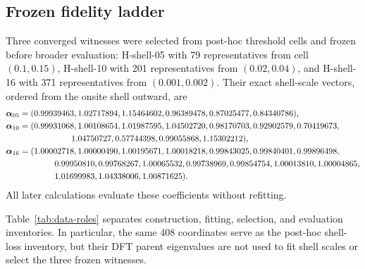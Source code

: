 \documentclass[11pt]{article}
\theoremstyle{definition}
\begin{document}
\subsection{Frozen fidelity ladder}

Three converged witnesses were selected from post-hoc threshold cells and frozen before
broader evaluation: H-shell-05 with 79 representatives from cell $(0.1,0.15)$,
H-shell-10 with 201 representatives from $(0.02,0.04)$, and H-shell-16 with 371
representatives from $(0.001,0.002)$.  Their exact shell-scale vectors, ordered from the
onsite shell outward, are
\begin{align}
 \boldsymbol\alpha_{05}={}&(0.99939463,1.02717894,1.15464602,
 0.96389478,0.87025477,0.84340786),\\
 \boldsymbol\alpha_{10}={}&(0.99931068,1.00108654,1.01987595,
 1.04502720,0.98170703,0.92902579,0.70419673,\nonumber\\
 &\hspace{17mm}1.04750727,0.57744398,0.99055868,1.15302212),\\
 \boldsymbol\alpha_{16}={}&(1.00002718,1.00000490,1.00195671,
 1.00018218,0.99843025,0.99840401,0.99896498,\nonumber\\
 &\hspace{10mm}0.99950810,0.99768267,1.00065532,0.99738969,
 0.99854754,1.00013810,1.00004865,\nonumber\\
 &\hspace{10mm}1.01699983,1.04338006,1.00871625).
 \label{eq:frozen-alpha-vectors}
\end{align}
All later calculations evaluate these coefficients without refitting.

Table~\ref{tab:data-roles} separates construction, fitting, selection, and evaluation
inventories.  In particular, the same 408 coordinates serve as the post-hoc shell-loss
inventory, but their DFT parent eigenvalues are not used to fit shell scales or select
the three frozen witnesses.
\end{document}
